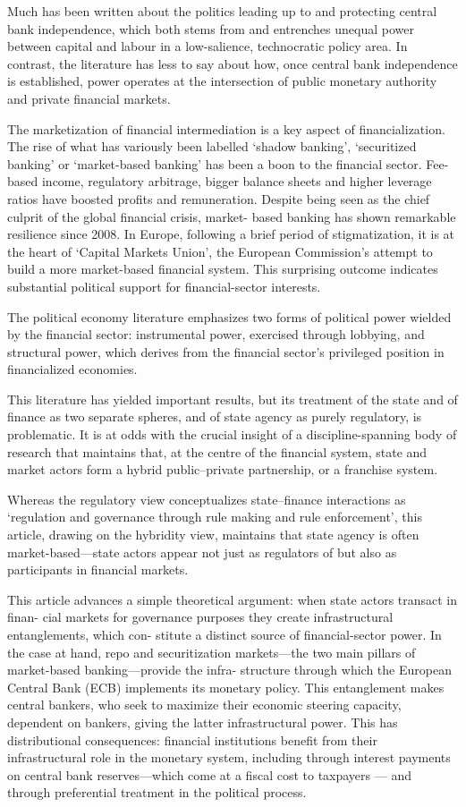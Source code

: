 \documentclass[
]{book}
\begin{document}
Much has been written about the politics leading up to and protecting central bank
independence, which both stems from and entrenches
unequal power between capital and labour in a low-salience, technocratic policy area. In
contrast, the literature has less to say about how, once central bank independence is
established, power operates at the intersection of public monetary authority and private financial
markets.

The marketization of financial intermediation is a key aspect of financialization.
The rise of what has variously been labelled `shadow banking', `securitized banking'
or `market-based banking' has been a boon to the financial sector.
Fee-based income, regulatory arbitrage, bigger balance sheets and higher leverage ratios
have boosted profits and remuneration.
Despite being seen as the chief culprit of the global financial crisis, market-
based banking has shown remarkable resilience since 2008.
In Europe, following a brief period of stigmatization, it is at the heart of
`Capital Markets Union', the European Commission's attempt to build a more market-based
financial system.
This surprising outcome indicates substantial political support for financial-sector interests.

The political economy literature emphasizes two forms of political power wielded by the
financial sector: instrumental power, exercised through lobbying, and structural power,
which derives from the financial sector's privileged position in financialized economies.

This literature has
yielded important results, but its treatment of the state and of finance as two separate
spheres, and of state agency as purely regulatory, is problematic. It is at odds with the crucial
insight of a discipline-spanning body of research that maintains that, at the centre of the
financial system, state and market actors form a hybrid public--private partnership, or a
franchise system.

Whereas the regulatory view conceptualizes state--finance interactions
as `regulation and governance through rule making and rule enforcement', this article,
drawing on the hybridity view, maintains that state agency is often
market-based---state actors appear not just as regulators of but also as participants in financial
markets.

This article advances a simple theoretical argument: when state actors transact in finan-
cial markets for governance purposes they create infrastructural entanglements, which con-
stitute a distinct source of financial-sector power. In the case at hand, repo and
securitization markets---the two main pillars of market-based banking---provide the infra-
structure through which the European Central Bank (ECB) implements its monetary policy.
This entanglement makes central bankers, who seek to maximize their economic steering
capacity, dependent on bankers, giving the latter infrastructural power. This has
distributional consequences: financial institutions benefit from their infrastructural role in the
monetary system, including through interest payments on central bank reserves---which
come at a fiscal cost to taxpayers --- and through preferential treatment in the political process.
\end{document}
